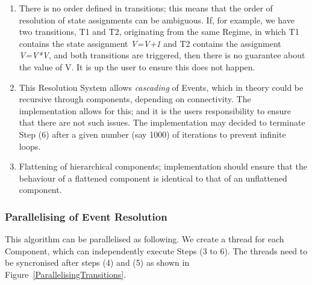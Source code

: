 \documentclass{article}
\begin{document}
\begin{enumerate}
\item  There is no order defined in transitions; this means
that the order of resolution of state assignments can be ambiguous. If, for
example, we have two transitions, T1 and T2, originating from the same Regime,
in which T1 contains the state assignment \textsl{V=V+1} and T2 contains the
assignment \textsl{V=V*V}, and both transitions are triggered, then there is no
guarantee about the value of V. It is up the user to ensure this does not
happen.

\item This Resolution System allows \emph{cascading} of Events, which in theory
could be recursive through components, depending on connectivity. The
implementation allows for this; and it is the users responsibility to ensure
that there are not such issues. The implementation may decided to terminate
Step (6) after a given number (say 1000) of iterations to prevent infinite
loops.

\item Flattening of hierarchical components; implementation should ensure that
the behaviour of a flattened component is identical to that of an unflattened
component.
\end{enumerate}

\subsubsection{Parallelising of Event Resolution}

This algorithm can be parallelised as following. We create a thread for each
Component, which can independently execute Steps (3 to 6). The threads need
to be syncronised after steps (4) and (5) as shown in
Figure~\ref{ParallelisingTransitions}.
\end{document}
